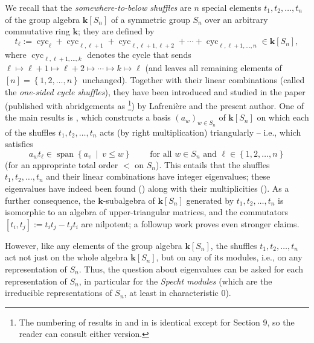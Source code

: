 \documentclass[numbers=enddot,12pt,final,onecolumn,notitlepage]{scrartcl}%
\theoremstyle{definition}
\begin{document}
We recall that the \emph{somewhere-to-below shuffles} are $n$ special elements
$t_{1},t_{2},\ldots,t_{n}$ of the group algebra $\mathbf{k}\left[
S_{n}\right]  $ of a symmetric group $S_{n}$ over an arbitrary commutative
ring $\mathbf{k}$; they are defined by
\[
t_{\ell}:=\operatorname*{cyc}\nolimits_{\ell}+\operatorname*{cyc}%
\nolimits_{\ell,\ell+1}+\operatorname*{cyc}\nolimits_{\ell,\ell+1,\ell
+2}+\cdots+\operatorname*{cyc}\nolimits_{\ell,\ell+1,\ldots,n}\in
\mathbf{k}\left[  S_{n}\right]  ,
\]
where $\operatorname*{cyc}\nolimits_{\ell,\ell+1,\ldots,k}$ denotes the cycle
that sends $\ell\mapsto\ell+1\mapsto\ell+2\mapsto\cdots\mapsto k\mapsto\ell$
(and leaves all remaining elements of $\left[  n\right]  =\left\{
1,2,\ldots,n\right\}  $ unchanged). Together with their linear combinations
(called the \emph{one-sided cycle shuffles}), they have been introduced and
studied in the paper \cite{s2b1} (published with abridgements as
\cite{s2b1-pub}\footnote{The numbering of results in \cite{s2b1} and in
\cite{s2b1-pub} is identical except for Section 9, so the reader can consult
either version.}) by Lafreni\`{e}re and the present author. One of the main
results is \cite[Theorem 11.1]{s2b1}, which constructs a basis $\left(
a_{w}\right)  _{w\in S_{n}}$ of $\mathbf{k}\left[  S_{n}\right]  $ on which
each of the shuffles $t_{1},t_{2},\ldots,t_{n}$ acts (by right multiplication)
triangularly -- i.e., which satisfies%
\[
a_{w}t_{\ell}\in\operatorname*{span}\left\{  a_{v}\ \mid\ v\leq w\right\}
\ \ \ \ \ \ \ \ \ \ \text{for all }w\in S_{n}\text{ and }\ell\in\left\{
1,2,\ldots,n\right\}
\]
(for an appropriate total order $<$ on $S_{n}$). This entails that the
shuffles $t_{1},t_{2},\ldots,t_{n}$ and their linear combinations have integer
eigenvalues; these eigenvalues have indeed been found (\cite[\S 12]{s2b1})
along with their multiplicities (\cite[\S 13]{s2b1}). As a further
consequence, the $\mathbf{k}$-subalgebra of $\mathbf{k}\left[  S_{n}\right]  $
generated by $t_{1},t_{2},\ldots,t_{n}$ is isomorphic to an algebra of
upper-triangular matrices, and the commutators $\left[  t_{i},t_{j}\right]
:=t_{i}t_{j}-t_{j}t_{i}$ are nilpotent; a followup work \cite{s2b2} proves
even stronger claims.

However, like any elements of the group algebra $\mathbf{k}\left[
S_{n}\right]  $, the shuffles $t_{1},t_{2},\ldots,t_{n}$ act not just on the
whole algebra $\mathbf{k}\left[  S_{n}\right]  $, but on any of its modules,
i.e., on any representation of $S_{n}$. Thus, the question about eigenvalues
can be asked for each representation of $S_{n}$, in particular for the
\emph{Specht modules} (which are the irreducible representations of $S_{n}$,
at least in characteristic $0$).
\end{document}

